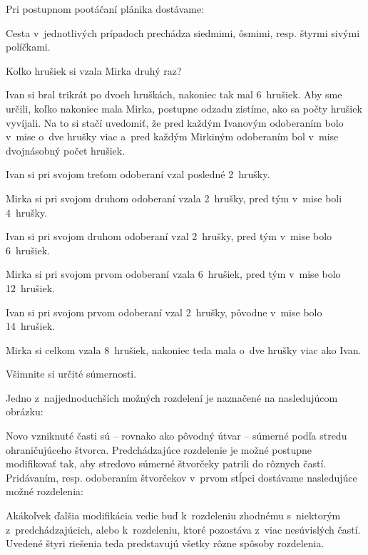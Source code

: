 {%
Pri postupnom pootáčaní plánika dostávame:
%


Cesta v~jednotlivých prípadoch prechádza siedmimi, ôsmimi, resp. štyrmi sivými políčkami.
}

{%
\napad
Koľko hrušiek si vzala Mirka druhý raz?

\riesenie
Ivan si bral trikrát po dvoch hruškách, nakoniec tak mal 6~hrušiek.
Aby sme určili, koľko nakoniec mala Mirka, postupne odzadu zistíme, ako sa počty hrušiek vyvíjali.
Na to si stačí uvedomiť, že pred každým Ivanovým odoberaním bolo v~mise o~dve hrušky viac a~pred každým Mirkiným odoberaním bol v~mise dvojnásobný počet hrušiek.

Ivan si pri svojom treťom odoberaní vzal posledné 2~hrušky.

Mirka si pri svojom druhom odoberaní vzala 2~hrušky, pred tým v~mise boli 4~hrušky.

Ivan si pri svojom druhom odoberaní vzal 2~hrušky, pred tým v~mise bolo 6~hrušiek.

Mirka si pri svojom prvom odoberaní vzala 6~hrušiek, pred tým v~mise bolo 12~hrušiek.

Ivan si pri svojom prvom odoberaní vzal 2~hrušky, pôvodne v~mise bolo 14~hrušiek.

Mirka si celkom vzala 8~hrušiek, nakoniec teda mala o~dve hrušky viac ako Ivan.
}

{%
\napad
Všimnite si určité súmernosti.

\riesenie
Jedno z~najjednoduchších možných rozdelení je naznačené na nasledujúcom obrázku:
%


Novo vzniknuté časti sú -- rovnako ako pôvodný útvar -- súmerné podľa stredu ohraničujúceho štvorca.
Predchádzajúce rozdelenie je možné postupne modifikovať tak, aby stredovo súmerné štvorčeky patrili do rôznych častí.
Pridávaním, resp. odoberaním štvorčekov v~prvom stĺpci dostávame nasledujúce možné rozdelenia:
%


\poznamka
Akákoľvek ďalšia modifikácia vedie buď k~rozdeleniu zhodnému s~niektorým z~predchádzajúcich, alebo k~rozdeleniu, ktoré pozostáva z~viac nesúvislých častí.
Uvedené štyri riešenia teda predstavujú všetky rôzne spôsoby rozdelenia.
}

